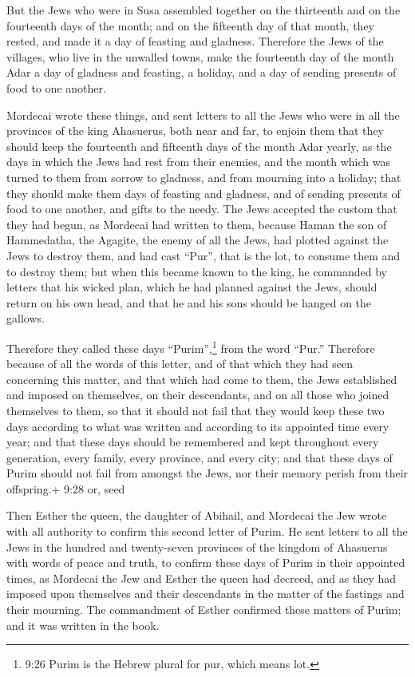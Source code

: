  But the Jews who were in Susa assembled together on the
thirteenth and on the fourteenth days of the month; and on the fifteenth
day of that month, they rested, and made it a day of feasting and
gladness.  Therefore the Jews of the villages, who live in
the unwalled towns, make the fourteenth day of the month Adar a day of
gladness and feasting, a holiday, and a day of sending presents of food
to one another.

 Mordecai wrote these things, and sent letters to all the
Jews who were in all the provinces of the king Ahasuerus, both near and
far,  to enjoin them that they should keep the fourteenth
and fifteenth days of the month Adar yearly,  as the days
in which the Jews had rest from their enemies, and the month which was
turned to them from sorrow to gladness, and from mourning into a
holiday; that they should make them days of feasting and gladness, and
of sending presents of food to one another, and gifts to the needy.
 The Jews accepted the custom that they had begun, as
Mordecai had written to them,  because Haman the son of
Hammedatha, the Agagite, the enemy of all the Jews, had plotted against
the Jews to destroy them, and had cast ``Pur'', that is the lot, to
consume them and to destroy them;  but when this became
known to the king, he commanded by letters that his wicked plan, which
he had planned against the Jews, should return on his own head, and that
he and his sons should be hanged on the gallows.

 Therefore they called these days ``Purim'',\footnote{9:26
  Purim is the Hebrew plural for pur, which means lot.} from the word
``Pur.'' Therefore because of all the words of this letter, and of that
which they had seen concerning this matter, and that which had come to
them,  the Jews established and imposed on themselves, on
their descendants, and on all those who joined themselves to them, so
that it should not fail that they would keep these two days according to
what was written and according to its appointed time every year;
 and that these days should be remembered and kept
throughout every generation, every family, every province, and every
city; and that these days of Purim should not fail from amongst the
Jews, nor their memory perish from their offspring.+ 9:28 or, seed

 Then Esther the queen, the daughter of Abihail, and
Mordecai the Jew wrote with all authority to confirm this second letter
of Purim.  He sent letters to all the Jews in the hundred
and twenty-seven provinces of the kingdom of Ahasuerus with words of
peace and truth,  to confirm these days of Purim in their
appointed times, as Mordecai the Jew and Esther the queen had decreed,
and as they had imposed upon themselves and their descendants in the
matter of the fastings and their mourning.  The commandment
of Esther confirmed these matters of Purim; and it was written in the
book.

